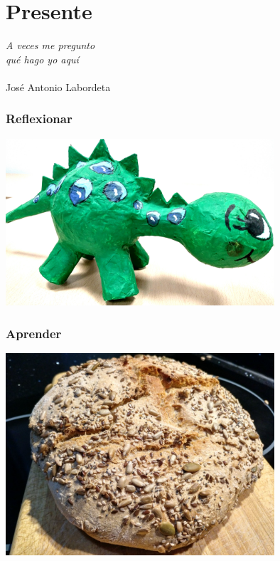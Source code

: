 
\section{Presente}

\begin{flushright}
{\em
  A veces me pregunto \\
  qué hago yo aquí \\
}
~ \\
José Antonio Labordeta \\
\end{flushright}

\begin{frame}[fragile]
  \frametitle{Reflexionar}

  \begin{center}
  \includegraphics[width=10cm]{figs/dinosaurio}
  \end{center}  
  
\end{frame}

\begin{frame}[fragile]
  \frametitle{Aprender}

  \begin{center}
  \includegraphics[width=10cm]{figs/pan}
  \end{center}  
  
\end{frame}

